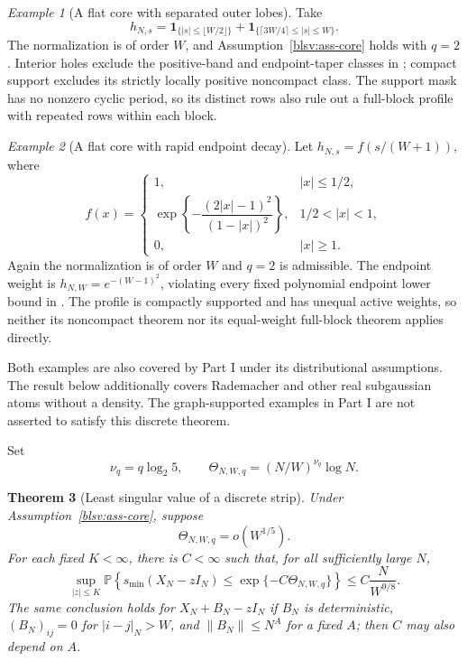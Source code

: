 \documentclass[11pt,reqno]{amsart}
\numberwithin{equation}{section}
\theoremstyle{plain}
\newtheorem{theorem}{Theorem}[section]
\theoremstyle{definition}
\theoremstyle{remark}
\newtheorem{example}[theorem]{Example}
\providecommand{\blsvP}{\mathbb P}
\providecommand{\blsvId}{I}
\providecommand{\blsvsmin}{s_{\min}}
\begin{document}
\begin{example}[A flat core with separated outer lobes]\label{ex:gapped-core}
Take
\[
 h_{N,s}=\mathbf1_{\{|s|\le\lfloor W/2\rfloor\}}
       +\mathbf1_{\{\lceil3W/4\rceil\le |s|\le W\}}.
\]
The normalization is of order $W$, and Assumption~\ref{blsv:ass-core}
holds with $q=2$. Interior holes exclude the positive-band and endpoint-taper
classes in \cite[Section~2.1]{han2026optimal}; compact support excludes
its strictly locally positive noncompact class. The support mask has
no nonzero cyclic period, so its distinct rows also rule out a full-block
profile with repeated rows within each block.
\end{example}

\begin{example}[A flat core with rapid endpoint decay]\label{ex:fast-taper}
Let $h_{N,s}=f(s/(W+1))$, where
\[
 f(x)=\begin{cases}
 1,&|x|\le1/2,\\
 \exp\!\left\{-\dfrac{(2|x|-1)^2}{(1-|x|)^2}\right\},&1/2<|x|<1,\\
 0,&|x|\ge1.
 \end{cases}
\]
Again the normalization is of order $W$ and $q=2$ is admissible.
The endpoint weight is $h_{N,W}=e^{-(W-1)^2}$, violating every fixed
polynomial endpoint lower bound in
\cite[Corollary~2.4]{han2026optimal}. The profile is compactly supported
and has unequal active weights, so neither its noncompact theorem nor
its equal-weight full-block theorem applies directly.
\end{example}

Both examples are also covered by Part I under its distributional
assumptions. The result below additionally covers Rademacher and other
real subgaussian atoms without a density. The graph-supported examples
in Part I are not asserted to satisfy this discrete theorem.


Set
\begin{equation}\label{blsv:eq-nu}
 \nu_q=q\log_2 5,\qquad
 \Theta_{N,W,q}=(N/W)^{\nu_q}\log N.
\end{equation}

\begin{theorem}[Least singular value of a discrete strip]\label{blsv:thm-strip}
Under Assumption~\ref{blsv:ass-core}, suppose
\begin{equation}\label{blsv:eq-cap-global}
 \Theta_{N,W,q}=o(W^{1/5}).
\end{equation}
For each fixed $K<\infty$, there is $C<\infty$ such that, for all
sufficiently large $N$,
\begin{equation}\label{blsv:eq-lsv-global}
 \sup_{|z|\le K}\blsvP\left\{
  \blsvsmin(X_N-z\blsvId_N)
  \le \exp\{-C\Theta_{N,W,q}\}\right\}
 \le C\frac{N}{W^{9/8}}.
\end{equation}
The same conclusion holds for $X_N+B_N-z\blsvId_N$ if $B_N$ is
deterministic, $(B_N)_{ij}=0$ for $|i-j|_N>W$, and
$\|B_N\|\le N^A$ for a fixed $A$; then $C$ may also depend on $A$.
\end{theorem}
\end{document}
